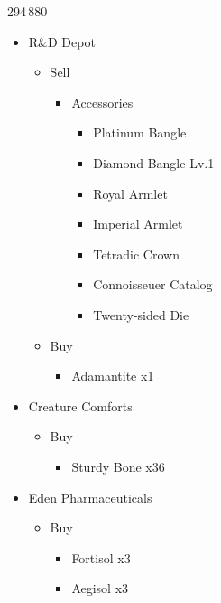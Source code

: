 \begin{shop}{294\,880}
	\begin{itemize}
		\item R\&D Depot
			\begin{itemize}
				\item Sell
					\begin{itemize}
						\item Accessories
							\begin{itemize}
								\item Platinum Bangle
								\item Diamond Bangle Lv.1
								\item Royal Armlet
								\item Imperial Armlet
								\item Tetradic Crown
								\item Connoisseuer Catalog
								\item Twenty-sided Die
							\end{itemize}
					\end{itemize}
				\item Buy
					\begin{itemize}
						\item Adamantite x1
					\end{itemize}
			\end{itemize}
		\item Creature Comforts
			\begin{itemize}
				\item Buy
					\begin{itemize}
						\item Sturdy Bone x36
					\end{itemize}
			\end{itemize}
		\item Eden Pharmaceuticals
			\begin{itemize}
				\item Buy
					\begin{itemize}
						\item Fortisol x3
						\item Aegisol x3
					\end{itemize}
			\end{itemize}		
	\end{itemize}
\end{shop}
\vfill
